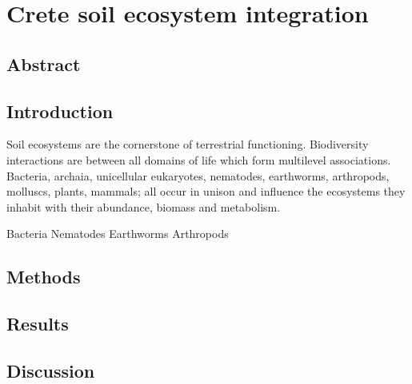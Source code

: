 % 
% 


\chapter{Crete soil ecosystem integration}
\label{cha:crete-soil}


%



\section{Abstract}

\section{Introduction}
\label{sec:crete-soil-intro}

Soil ecosystems are the cornerstone of terrestrial functioning.
Biodiversity interactions are between all domains of life which form
multilevel associations. Bacteria, archaia, unicellular eukaryotes, nematodes,
earthworms, arthropods, molluscs, plants, mammals; all occur in unison and 
influence the ecosystems they inhabit with their abundance, biomass \citep{bar2018biomass} and metabolism.

Bacteria \citep{Delgado-Baquerizo-atlas}
Nematodes \citep{vandenHoogen2019}
Earthworms \citep{Phillips2021}
Arthropods \citep{milo-arthropods}



\section{Methods}
\label{sec:crete-soil-method}

\section{Results}
\label{sec:crete-soil-results}

\section{Discussion}
\label{sec:crete-soil-discussion}

% 
